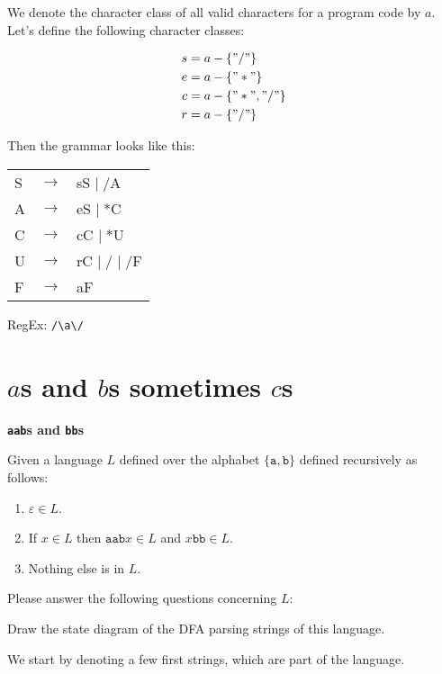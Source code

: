 \documentclass[a4paper]{exam}
\theoremstyle{remark}
\newenvironment{grammar}
	{\begin{tabular}[b]{lcl}}
	{\end{tabular}}
\newcommand{\rewritten}{$\to$}
\newcommand{\alternative}{$\mid \;$}
\begin{document}
\begin{questions}
\begin{otherlanguage}{german}
\end{otherlanguage}

\begin{solution}
	We denote the character class of all valid characters for a program code by $a$. Let's define the following character classes:
	
	\begin{align}
		s &= a - \{"/"\} \\
		e & = a - \{"*"\} \\
		c &= a - \{"*", "/"\} \\
		r &= a - \{"/"\}
	\end{align}

	Then the grammar looks like this:

	\begin{grammar}
		S & \rewritten & sS \alternative /A \\
		A & \rewritten & eS \alternative *C \\
		C & \rewritten & cC \alternative *U \\
		U & \rewritten & rC \alternative / \alternative /F \\
		F & \rewritten & aF
	\end{grammar}
	
	RegEx: {\tt /\textbackslash*a\textbackslash*/}
\end{solution}

\section{$a$s and $b$s sometimes $c$s}
\question
	\textbf{\texttt{aab}s and \texttt{bb}s}
	
	Given a language $L$ defined over the alphabet $\{\mathtt{a}, \mathtt{b}\}$ defined recursively as follows:
	\begin{enumerate}
		\item $\varepsilon \in L$.
		\item If $x \in L$ then $\mathtt{aab}x \in L$ and $x\mathtt{bb} \in L$.
		\item Nothing else is in $L$.
	\end{enumerate}
	
	Please answer the following questions concerning $L$:
	\begin{parts}
		\item Draw the state diagram of the DFA parsing strings of this language.
		\begin{solution}
			We start by denoting a few first strings, which are part of the language.
			

\end{solution}
\end{parts}
\end{questions}
\end{document}
